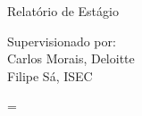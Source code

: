 \vfill %

{\centering
    \large{Relatório de Estágio} \\
    \vspace{0.5cm} %

    {\small
    Supervisionado por: \\
    Carlos Morais, Deloitte \\
    Filipe Sá, ISEC \\ }
}

\baselineskip=\normalbaselineskip
\restoregeometry

